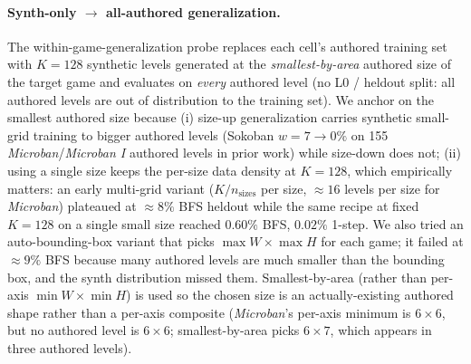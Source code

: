 \paragraph{Synth-only $\to$ all-authored generalization.}
\label{app:synth-only}
The within-game-generalization probe replaces each cell's authored
training set with $K{=}128$ synthetic levels generated at the
\emph{smallest-by-area} authored size of the target game and evaluates
on \emph{every} authored level (no L0 / heldout split: all authored
levels are out of distribution to the training set). We anchor on the
smallest authored size because (i) size-up generalization carries
synthetic small-grid training to bigger authored levels (Sokoban
$w{=}7 \to 0\%$ on 155 \textit{Microban}/\textit{Microban I}
authored levels in prior work) while size-down does not; (ii) using
a single size keeps the per-size data density at $K{=}128$, which
empirically matters: an early multi-grid variant
($K / n_{\text{sizes}}$ per size, $\approx 16$ levels per size for
\textit{Microban}) plateaued at $\approx 8\%$ BFS heldout while the same recipe
at fixed $K{=}128$ on a single small size reached $0.60\%$ BFS,
$0.02\%$ 1-step. We also tried an auto-bounding-box variant that
picks $\max W \times \max H$ for each game; it failed at $\approx 9\%$
BFS because many authored levels are much smaller than the bounding
box, and the synth distribution missed them. Smallest-by-area (rather
than per-axis $\min W \times \min H$) is used so the chosen size is
an actually-existing authored shape rather than a per-axis composite
(\textit{Microban}'s per-axis minimum is $6{\times}6$, but no authored
level is $6{\times}6$; smallest-by-area picks $6{\times}7$, which
appears in three authored levels).

